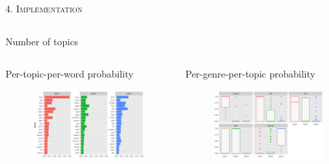 \documentclass[fleqn,final]{beamer}
\begin{document}
\begin{frame}
\begin{columns}[t]
\begin{column}{.46\linewidth}
\begin{block}{\rule[-2.5mm]{0cm}{1cm}\textsc{4. Implementation}}
\begin{column}{.98\linewidth}
\begin{block}{\small{Number of topics}}
\end{block}
\end{column}
\vspace{-1.3cm}

\begin{columns}[t]
\begin{column}{.47\linewidth}
{\small 
\vspace{-1.3cm}	
\begin{block}{\small{Per-topic-per-word probability}}
\vspace{0.2cm}	
\begin{figure}[H]
	\centering
		\includegraphics[width=\textwidth]{topic_word_3_20.png}
\end{figure}

\end{block}
}
\end{column}			

\begin{column}{.47\linewidth}
{\small 			
\vspace{-1.3cm}	
\begin{block}{\small{Per-genre-per-topic probability}}
\begin{figure}[H]
	\centering
		\includegraphics[width=\textwidth]{genre_topic_3.png}
\end{figure}


\end{block}}
\end{column}
\end{columns}
\end{block}
\end{column}
\end{columns}
\end{frame}
\end{document}
